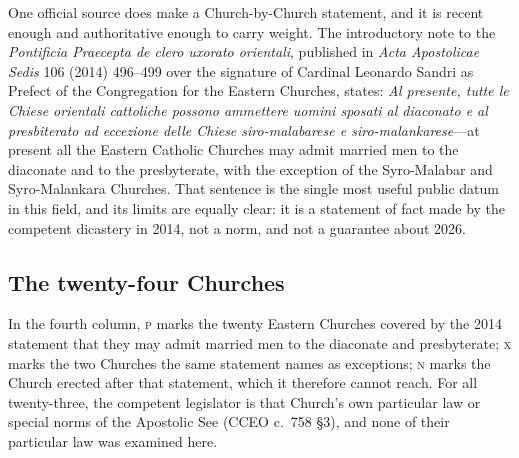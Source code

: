 One official source does make a Church-by-Church statement, and it is recent enough and authoritative enough to carry weight. The introductory note to the \emph{Pontificia Praecepta de clero uxorato orientali}, published in \emph{Acta Apostolicae Sedis} 106 (2014) 496--499 over the signature of Cardinal Leonardo Sandri as Prefect of the Congregation for the Eastern Churches, states: \emph{Al presente, tutte le Chiese orientali cattoliche possono ammettere uomini sposati al diaconato e al presbiterato ad eccezione delle Chiese siro-malabarese e siro-malankarese}---at present all the Eastern Catholic Churches may admit married men to the diaconate and to the presbyterate, with the exception of the Syro-Malabar and Syro-Malankara Churches. That sentence is the single most useful public datum in this field, and its limits are equally clear: it is a statement of fact made by the competent dicastery in 2014, not a norm, and not a guarantee about 2026.

\subsection{The twenty-four Churches}

\begingroup
\footnotesize
In the fourth column, \textsc{p} marks the twenty Eastern Churches covered by the 2014 statement that they may admit married men to the diaconate and presbyterate; \textsc{x} marks the two Churches the same statement names as exceptions; \textsc{n} marks the Church erected after that statement, which it therefore cannot reach. For all twenty-three, the competent legislator is that Church's own particular law or special norms of the Apostolic See (CCEO c.~758 §3), and none of their particular law was examined here.

